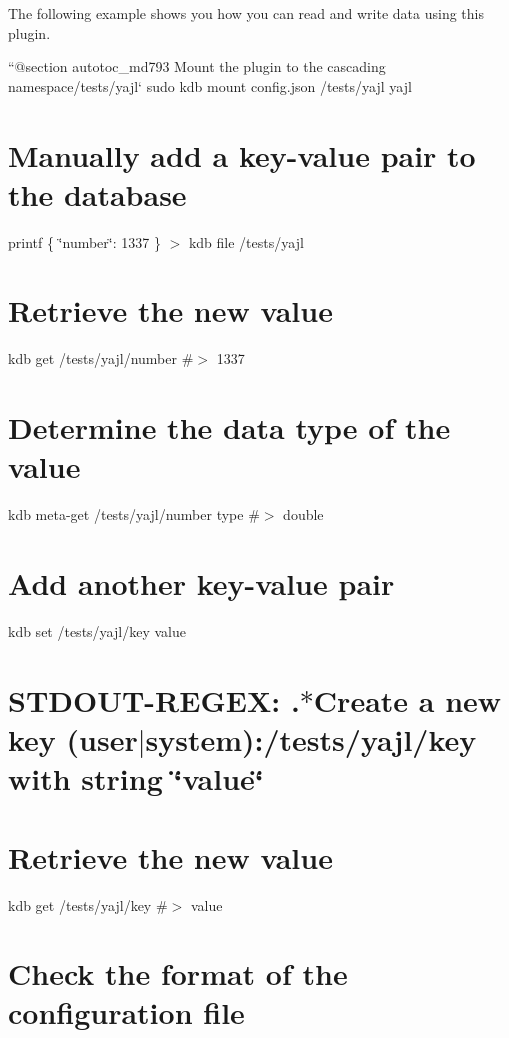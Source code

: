 The following example shows you how you can read and write data using this plugin.

``{\ttfamily  @section autotoc\+\_\+md793 Mount the plugin to the cascading namespace}/tests/yajl` sudo kdb mount config.\+json /tests/yajl yajl\hypertarget{autotoc_md786_autotoc_md794}{}\section{Manually add a key-\/value pair to the database}\label{autotoc_md786_autotoc_md794}
printf \textquotesingle{}\{ \char`\"{}number\char`\"{}\+: 1337 \}\textquotesingle{} $>$ {\ttfamily kdb file /tests/yajl}\hypertarget{autotoc_md786_autotoc_md795}{}\section{Retrieve the new value}\label{autotoc_md786_autotoc_md795}
kdb get /tests/yajl/number \#$>$ 1337\hypertarget{autotoc_md786_autotoc_md796}{}\section{Determine the data type of the value}\label{autotoc_md786_autotoc_md796}
kdb meta-\/get /tests/yajl/number type \#$>$ double\hypertarget{autotoc_md786_autotoc_md797}{}\section{Add another key-\/value pair}\label{autotoc_md786_autotoc_md797}
kdb set /tests/yajl/key value \hypertarget{autotoc_md786_autotoc_md798}{}\section{S\+T\+D\+O\+U\+T-\/\+R\+E\+G\+E\+X\+: .$\ast$\+Create a new key (user$\vert$system)\+:/tests/yajl/key with string \char`\"{}value\char`\"{}}\label{autotoc_md786_autotoc_md798}
\hypertarget{autotoc_md786_autotoc_md799}{}\section{Retrieve the new value}\label{autotoc_md786_autotoc_md799}
kdb get /tests/yajl/key \#$>$ value\hypertarget{autotoc_md786_autotoc_md800}{}\section{Check the format of the configuration file}\label{autotoc_md786_autotoc_md800}
